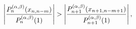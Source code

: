 \[\left|\frac{\mathop{P^{(\alpha,\beta)}_{n}\/}\nolimits\!\left(x_{n,n-m}\right)%
}{\mathop{P^{(\alpha,\beta)}_{n}\/}\nolimits\!\left(1\right)}\right|>\left|%
\frac{\mathop{P^{(\alpha,\beta)}_{n+1}\/}\nolimits\!\left(x_{n+1,n-m+1}\right)%
}{\mathop{P^{(\alpha,\beta)}_{n+1}\/}\nolimits\!\left(1\right)}\right|,\]